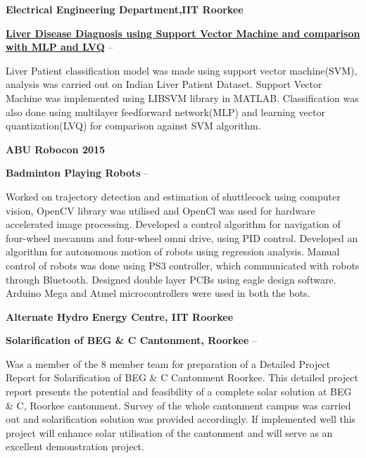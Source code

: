 \documentclass[a4paper,10pt,oneside]{article}
\begin{document}
\begin{body}
{\EntryGap
{\textbf{Electrical Engineering Department,IIT Roorkee}}
\par
\href{https://drive.google.com/file/d/0B_52cv1ZRKUmWXVsNlA4cXF2LWR3Skxsb2ctSHRtMmFBQlRz/view?usp=sharing}
{\textbf{Liver Disease Diagnosis using Support Vector Machine and comparison \newline with MLP and LVQ}}
\hfill
{} -- 
\begin{detail}
\BulletItem
Liver Patient classification model was made using support vector machine(SVM), analysis was carried out on Indian Liver Patient Dataset. 
\BulletItem
Support Vector Machine was implemented using LIBSVM library in MATLAB. 
\BulletItem
Classification was also done using multilayer feedforward network(MLP) and learning vector quantization(LVQ) for comparison against SVM algorithm.
\end{detail}

\EntryGap

{\textbf{ABU Robocon 2015}}
\par
{\textbf{Badminton Playing Robots}}
\hfill
{} --
\begin{detail}

\BulletItem
Worked on trajectory detection and estimation of shuttlecock using computer vision, OpenCV library was utilised and OpenCl was used for hardware accelerated image processing. 
\BulletItem
Developed a control algorithm for navigation of four-wheel mecanum and four-wheel omni drive, using PID control. 
\BulletItem
Developed an algorithm for autonomous motion of robots using regression analysis. 
\BulletItem
Manual control of robots was done using PS3 controller, which communicated with robots through Bluetooth. 
\BulletItem
Designed double layer PCBs using eagle design software. 
\BulletItem
Arduino Mega and Atmel microcontrollers were used in both the bots.
\end{detail}

\EntryGap


{\textbf{Alternate Hydro Energy Centre, IIT Roorkee}}
\par
{\textbf{Solarification of BEG \& C Cantonment, Roorkee}}
\hfill
{} --

\begin{detail}
\BulletItem
Was a member of the 8 member team for preparation of a Detailed Project Report for Solarification of BEG \& C Cantonment Roorkee. 
\BulletItem
This detailed project report presents the potential and feasibility of a complete solar solution at BEG \& C, Roorkee cantonment. 
\BulletItem
Survey of the whole cantonment campus was carried out and solarification solution was provided accordingly. 
\BulletItem
If implemented well this project will enhance solar utilisation of the cantonment and will serve as an excellent demonstration project.
\end{detail}

}
\end{body}
\end{document}
